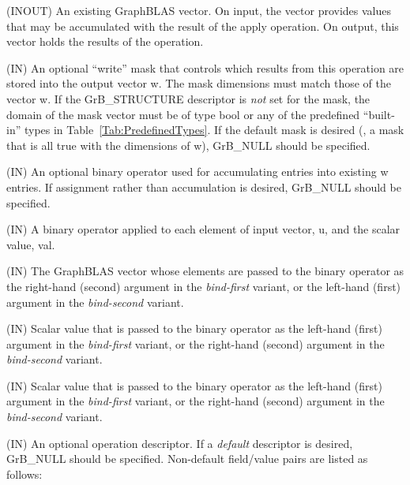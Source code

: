 \begin{itemize}[leftmargin=1.1in]
    \item[{\sf w}]    ({\sf INOUT}) An existing GraphBLAS vector.  On input,
    the vector provides values that may be accumulated with the result of the
    apply operation.  On output, this vector holds the results of the
    operation.

    \item[{\sf mask}] ({\sf IN}) An optional ``write'' mask that controls which
    results from this operation are stored into the output vector {\sf w}. The 
    mask dimensions must match those of the vector {\sf w}. If the 
    {\sf GrB\_STRUCTURE} descriptor is {\em not} set for the mask, the domain of the
    {\sf mask} vector must be of type {\sf bool} or any of the predefined 
    ``built-in'' types in Table~\ref{Tab:PredefinedTypes}.  If the default
    mask is desired (\ie, a mask that is all {\sf true} with the dimensions of {\sf w}), 
    {\sf GrB\_NULL} should be specified.

    \item[{\sf accum}] ({\sf IN}) An optional binary operator used for accumulating
    entries into existing {\sf w} entries. If assignment rather than accumulation is
    desired, {\sf GrB\_NULL} should be specified.

    \item[{\sf op}]	({\sf IN}) A binary operator applied to each element of input 
    vector, {\sf u}, and the scalar value, {\sf val}.
        
    \item[{\sf u}] ({\sf IN}) The GraphBLAS vector whose elements are passed 
    to the binary operator as the right-hand (second) argument in the 
    {\em bind-first} variant, or the left-hand (first) argument in the 
    {\em bind-second} variant.

    \item[{\sf val}] ({\sf IN}) Scalar value that is passed to the binary operator 
    as the left-hand (first) argument in the {\em bind-first} variant, or 
    the right-hand (second) argument in the {\em bind-second} variant.

{\color{red}
    \item[{\sf s}] ({\sf IN}) Scalar value that is passed to the binary operator 
    as the left-hand (first) argument in the {\em bind-first} variant, or 
    the right-hand (second) argument in the {\em bind-second} variant.
}
    
    \item[{\sf desc}] ({\sf IN}) An optional operation descriptor. If
    a \emph{default} descriptor is desired, {\sf GrB\_NULL} should be
    specified. Non-default field/value pairs are listed as follows:  \\


\end{itemize}
